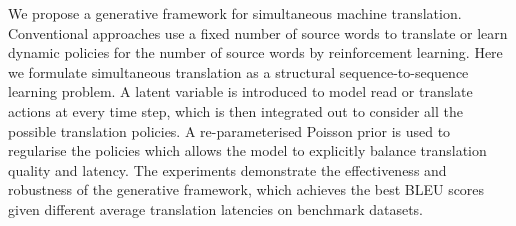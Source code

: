 We propose a generative framework for simultaneous machine translation. Conventional approaches use a fixed number of source words to translate or learn dynamic policies for the number of source words by reinforcement learning. Here we formulate simultaneous translation as a structural sequence-to-sequence learning problem. A latent variable is introduced to model read or translate actions at every time step, which is then integrated out to consider all the possible translation policies. A re-parameterised Poisson prior is used to regularise the policies which allows the model to explicitly balance  translation quality and latency. The experiments demonstrate the effectiveness and robustness of the generative framework, which achieves the best BLEU scores given different average translation latencies on benchmark datasets.
